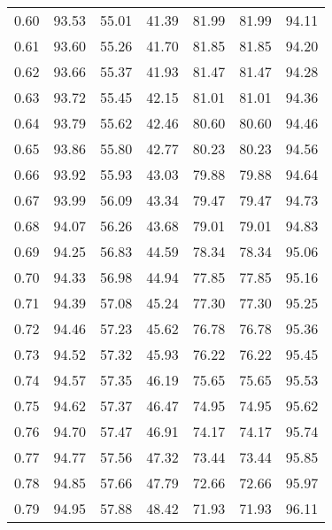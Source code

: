 \begin{tabular}{|c|c|c|c|c|c|c|}
      0.60 &     93.53 &     55.01 &      41.39 &   81.99 &      81.99 &         94.11 \\
      0.61 &     93.60 &     55.26 &      41.70 &   81.85 &      81.85 &         94.20 \\
      0.62 &     93.66 &     55.37 &      41.93 &   81.47 &      81.47 &         94.28 \\
      0.63 &     93.72 &     55.45 &      42.15 &   81.01 &      81.01 &         94.36 \\
      0.64 &     93.79 &     55.62 &      42.46 &   80.60 &      80.60 &         94.46 \\
      0.65 &     93.86 &     55.80 &      42.77 &   80.23 &      80.23 &         94.56 \\
      0.66 &     93.92 &     55.93 &      43.03 &   79.88 &      79.88 &         94.64 \\
      0.67 &     93.99 &     56.09 &      43.34 &   79.47 &      79.47 &         94.73 \\
      0.68 &     94.07 &     56.26 &      43.68 &   79.01 &      79.01 &         94.83 \\
      0.69 &     94.25 &     56.83 &      44.59 &   78.34 &      78.34 &         95.06 \\
      0.70 &     94.33 &     56.98 &      44.94 &   77.85 &      77.85 &         95.16 \\
      0.71 &     94.39 &     57.08 &      45.24 &   77.30 &      77.30 &         95.25 \\
      0.72 &     94.46 &     57.23 &      45.62 &   76.78 &      76.78 &         95.36 \\
      0.73 &     94.52 &     57.32 &      45.93 &   76.22 &      76.22 &         95.45 \\
      0.74 &     94.57 &     57.35 &      46.19 &   75.65 &      75.65 &         95.53 \\
      0.75 &     94.62 &     57.37 &      46.47 &   74.95 &      74.95 &         95.62 \\
      0.76 &     94.70 &     57.47 &      46.91 &   74.17 &      74.17 &         95.74 \\
      0.77 &     94.77 &     57.56 &      47.32 &   73.44 &      73.44 &         95.85 \\
      0.78 &     94.85 &     57.66 &      47.79 &   72.66 &      72.66 &         95.97 \\
      0.79 &     94.95 &     57.88 &      48.42 &   71.93 &      71.93 &         96.11 \\

\end{tabular}
